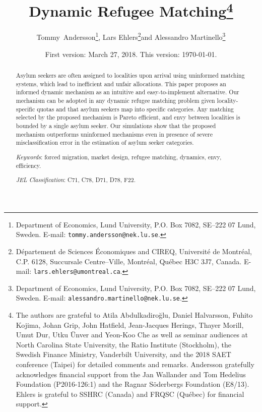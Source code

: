 \documentclass[12pt,fleqn]{article}
\begin{document}
\title{\textbf{Dynamic Refugee Matching}\footnote{The authors are grateful to Atila Abdulkadiro\u{g}lu, Daniel Halvarsson, Fuhito Kojima, Johan Grip, John Hatfield, Jean-Jacques Herings, Thayer Morill, Umut Dur, Utku \"{U}nver and Yeon-Koo Che as well as seminar audiences at North Carolina State University, the Ratio Institute (Stockholm), the Swedish Finance Ministry, Vanderbilt University, and the 2018 SAET conference (Taipei) for detailed comments and remarks. Andersson gratefully acknowledges financial support from the Jan Wallander and Tom Hedelius Foundation (P2016-126:1) and the Ragnar S\"oderbergs Foundation (E8/13). Ehlers is grateful to SSHRC (Canada) and FRQSC (Qu\'{e}bec) for financial support.}}

\author{Tommy~Andersson\footnote{Department of Economics, Lund University, P.O. Box 7082, SE--222 07 Lund, Sweden. E-mail: \texttt{tommy.andersson@nek.lu.se}.}, Lars Ehlers\footnote{D\'epartement de Sciences \'Economiques and CIREQ, Universit\'e de Montr\'eal, C.P. 6128, Succursale Centre--Ville, Montr\'eal, Qu\'ebec H3C
3J7, Canada. E-mail: \texttt{lars.ehlers@umontreal.ca}.}\space\space and Alessandro Martinello\footnote{Department of Economics, Lund University, P.O. Box 7082, SE--222 07 Lund, Sweden. E-mail: \texttt{alessandro.martinello@nek.lu.se}.}}

\date{\small{First version: March 27, 2018. This version: \today.}}

\maketitle
\vspace*{-4mm}
\begin{abstract}
\noindent Asylum seekers are often assigned to localities upon arrival using uninformed matching systems, which lead to inefficient and unfair allocations. This paper proposes an informed dynamic mechanism as an intuitive and easy-to-implement alternative. Our mechanism can be adopted in any dynamic refugee matching problem given locality-specific quotas and that asylum seekers map into specific categories. Any matching selected by the proposed mechanism is Pareto efficient, and envy between localities is bounded by a single asylum seeker. Our simulations show that the proposed mechanism outperforms uninformed mechanisms even in presence of severe misclassification error in the estimation of asylum seeker categories.

\medskip

\noindent\emph{Keywords}: forced migration, market design, refugee matching, dynamics, envy, efficiency.

\medskip

\noindent\emph{JEL Classification}: C71, C78, D71, D78, F22.

\end{abstract}
\end{document}
